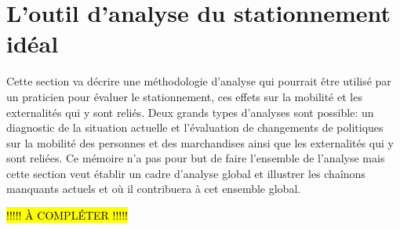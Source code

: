 \section{L'outil d'analyse du stationnement idéal}
Cette section va décrire une méthodologie d'analyse qui pourrait être utilisé par un praticien pour évaluer le stationnement, ces effets sur la mobilité et les externalités qui y sont reliés. Deux grands types d'analyses sont possible: un diagnostic de la situation actuelle et l'évaluation de changements de politiques sur la mobilité des personnes et des marchandises ainsi que les externalités qui y sont reliées. Ce mémoire n'a pas pour but de faire l'ensemble de l'analyse mais cette section veut établir un cadre d'analyse global et illustrer les chaînons manquants actuels et où il contribuera à cet ensemble global.\par

\hl{!!!!! À COMPLÉTER !!!!!}

